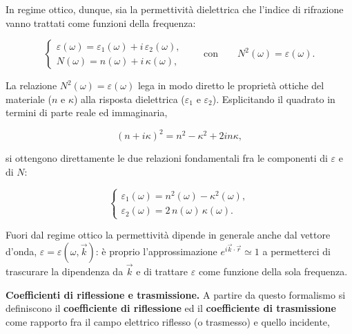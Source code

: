 In regime ottico, dunque, sia la permettività dielettrica che l'indice di rifrazione vanno trattati come funzioni della frequenza:

\begin{importantbox}
    \begin{equation}
        \begin{cases}
            \varepsilon(\omega) = \varepsilon_1(\omega) + i \, \varepsilon_2(\omega), \\[0.4em]
            N(\omega) = n(\omega) + i \, \kappa(\omega),
        \end{cases}
        \qquad \text{con} \qquad N^{2}(\omega) = \varepsilon(\omega).
    \end{equation}
\end{importantbox}

La relazione \( N^{2}(\omega) = \varepsilon(\omega) \) lega in modo diretto le proprietà ottiche del materiale (\( n \) e \( \kappa \)) alla risposta dielettrica (\( \varepsilon_1 \) e \( \varepsilon_2 \)). Esplicitando il quadrato in termini di parte reale ed immaginaria,

\begin{equation}
    (n + i \kappa)^{2} = n^{2} - \kappa^{2} + 2 i n \kappa,
\end{equation}

si ottengono direttamente le due relazioni fondamentali fra le componenti di \( \varepsilon \) e di \( N \):

\begin{importantbox}
    \begin{equation}
        \begin{cases}
            \varepsilon_1(\omega) = n^{2}(\omega) - \kappa^{2}(\omega), \\[0.4em]
            \varepsilon_2(\omega) = 2 \, n(\omega) \, \kappa(\omega).
        \end{cases}
    \end{equation}
\end{importantbox}

\begin{remark}
Fuori dal regime ottico la permettività dipende in generale anche dal vettore d'onda, \( \varepsilon = \varepsilon(\omega, \vec{k}) \): è proprio l'approssimazione \( e^{i \vec{k} \cdot \vec{r}} \simeq 1 \) a permetterci di trascurare la dipendenza da \( \vec{k} \) e di trattare \( \varepsilon \) come funzione della sola frequenza.
\end{remark}

\textbf{Coefficienti di riflessione e trasmissione.} A partire da questo formalismo si definiscono il \textbf{coefficiente di riflessione} ed il \textbf{coefficiente di trasmissione} come rapporto fra il campo elettrico riflesso (o trasmesso) e quello incidente,

